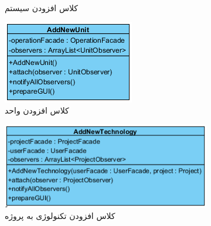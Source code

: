 \begin{figure}[H]
\begin{subfigure}[b]{0.3\textwidth}
		\caption{کلاس افزودن سیستم }
	\end{subfigure}
	\begin{subfigure}[b]{0.3\textwidth}
		\includegraphics[width=\textwidth]{img/class-design/ui/AddNewUnit}
		\caption{کلاس افزودن واحد }
	\end{subfigure}
	\begin{subfigure}[b]{0.4\textwidth}
		\includegraphics[width=\textwidth]{img/class-design/ui/AddNewTechnology}
		\caption{کلاس افزودن تکنولوژی به پروژه}
	\end{subfigure}
	\begin{subfigure}[b]{0.3\textwidth}

\end{subfigure}
\end{figure}
